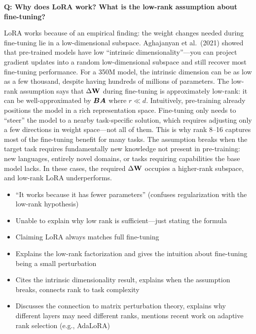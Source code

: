 \begin{interviewq}
\textbf{Q: Why does LoRA work? What is the low-rank assumption about fine-tuning?}

 \quad {} \quad \badgefreq{\freqmed}

\stronganswer LoRA works because of an empirical finding: the weight changes needed during fine-tuning lie in a low-dimensional subspace. Aghajanyan et al.\ (2021) showed that pre-trained models have low ``intrinsic dimensionality''---you can project gradient updates into a random low-dimensional subspace and still recover most fine-tuning performance. For a 350M model, the intrinsic dimension can be as low as a few thousand, despite having hundreds of millions of parameters. The low-rank assumption says that $\Delta \mathbf{W}$ during fine-tuning is approximately low-rank: it can be well-approximated by $\bm{B} \bm{A}$ where $r \ll d$. Intuitively, pre-training already positions the model in a rich representation space. Fine-tuning only needs to ``steer'' the model to a nearby task-specific solution, which requires adjusting only a few directions in weight space---not all of them. This is why rank 8--16 captures most of the fine-tuning benefit for many tasks. The assumption breaks when the target task requires fundamentally new knowledge not present in pre-training: new languages, entirely novel domains, or tasks requiring capabilities the base model lacks. In these cases, the required $\Delta \mathbf{W}$ occupies a higher-rank subspace, and low-rank LoRA underperforms.

\redflags
\begin{itemize}
    \item ``It works because it has fewer parameters'' (confuses regularization with the low-rank hypothesis)
    \item Unable to explain why low rank is sufficient---just stating the formula
    \item Claiming LoRA always matches full fine-tuning
\end{itemize}


\goodgreat
\begin{itemize}
    \item {} Explains the low-rank factorization and gives the intuition about fine-tuning being a small perturbation
    \item {} Cites the intrinsic dimensionality result, explains when the assumption breaks, connects rank to task complexity
    \item {} Discusses the connection to matrix perturbation theory, explains why different layers may need different ranks, mentions recent work on adaptive rank selection (e.g., AdaLoRA)
\end{itemize}

\end{interviewq}

